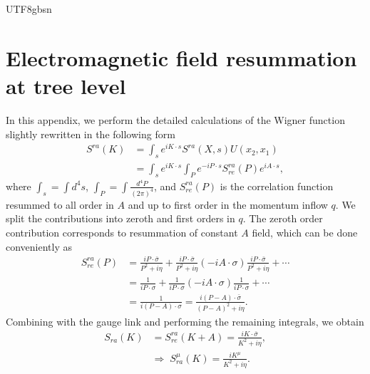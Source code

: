 \documentclass[11pt]{article}\def\baselinestretch{1.4}
\def\h{\eta}
\def\m{{\mu}}
\def\s{{\sigma}}
\begin{document}
\begin{CJK}{UTF8}{gbsn}
\appendix

\section{Electromagnetic field resummation at tree level }\label{sec_app_A}
In this appendix, we perform the detailed calculations of the Wigner function slightly rewritten in the following form
\begin{align}\label{Wigner}
S^{ra}(K) &= \int_s e^{iK \cdot s} S^{ra}(X,s)U(x_2,x_1) \nonumber\\
&= \int_s e^{iK \cdot s} \int_P e^{-iP \cdot s} S^{ra}_{re}(P)e^{iA \cdot s},
\end{align}
where $\int_s= \int d^4s$, $\int_P= \int \frac{d^4P}{(2\pi )^4}$, and $S^{ra}_{re}(P)$ is the correlation function resummed to all order in $A$ and up to first order in the momentum inflow $q$. We split the contributions into zeroth and first orders in $q$. The zeroth order contribution corresponds to resummation of constant $A$ field, which can be done conveniently as 
\begin{align}
S_{re}^{ra}(P)&=\frac{iP\cdot\bar{\s}}{P^2+i\h}+\frac{iP\cdot\bar{\s}}{P^2+i\h}(-iA\cdot\s)\frac{iP\cdot\bar{\s}}{P^2+i\h}+\cdots\nonumber\\
			&=\frac{1}{iP\cdot\s}+\frac{1}{iP\cdot\s}(-iA\cdot\s)\frac{1}{iP\cdot\s}+\cdots\nonumber\\
			&=\frac{1}{i(P-A)\cdot\s}=\frac{i(P-A)\cdot\bar{\s}}{(P-A)^2+i\h}.
\end{align}
Combining with the gauge link and performing the remaining integrals, we obtain
\begin{align}\label{O1}
S_{ra}(K)&=S_{re}^{ra}(K+A)=\frac{iK\cdot\bar{\s}}{K^2+i\h},\nonumber\\
	&\Rightarrow\; S_{ra}^\m(K)=\frac{iK^\m}{K^2+i\h}.
\end{align}


\end{CJK}
\end{document}
